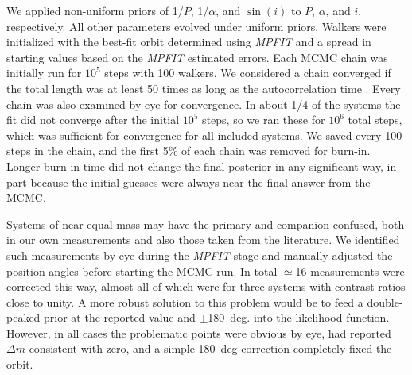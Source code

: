 \documentclass[twocolumn]{aastex62}
\begin{document}
We applied non-uniform priors of 1/$P$, 1/$\alpha$, and $\sin(i)$ to $P$, $\alpha$, and $i$, respectively. All other parameters evolved under uniform priors. Walkers were initialized with the best-fit orbit determined using \textit{MPFIT} \citep{Markwart2009} and a spread in starting values based on the \textit{MPFIT} estimated errors. Each MCMC chain was initially run for $10^5$ steps with 100 walkers. We considered a chain converged if the total length was at least 50 times as long as the autocorrelation time \citep{2010CAMCS...5...65G}. Every chain was also examined by eye for convergence. In about 1/4 of the systems the fit did not converge after the initial $10^5$ steps, so we ran these for $10^6$ total steps, which was sufficient for convergence for all included systems. We saved every 100 steps in the chain, and the first 5\% of each chain was removed for burn-in. Longer burn-in time did not change the final posterior in any significant way, in part because the initial guesses were always near the final answer from the MCMC. 

Systems of near-equal mass may have the primary and companion confused, both in our own measurements and also those taken from the literature. We identified such measurements by eye during the \textit{MPFIT} stage and manually adjusted the position angles before starting the MCMC run. In total $\simeq$16 measurements were corrected this way, almost all of which were for three systems with contrast ratios close to unity. A more robust solution to this problem would be to feed a double-peaked prior at the reported value and $\pm$180~deg. into the likelihood function. However, in all cases the problematic points were obvious by eye, had reported $\Delta m$ consistent with zero, and a simple 180~deg correction completely fixed the orbit. 
\end{document}
